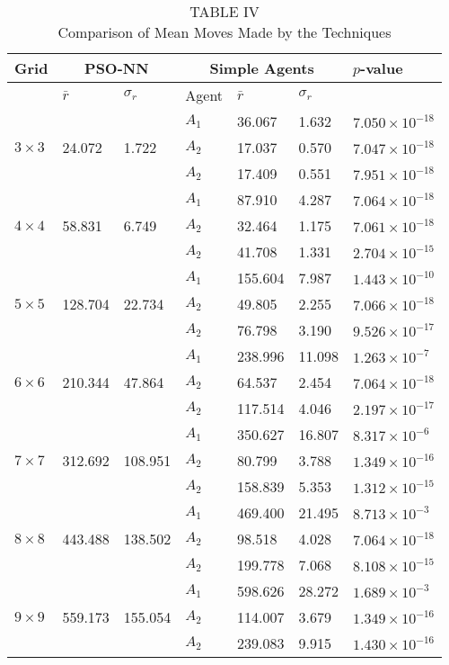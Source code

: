 \documentclass[10pt]{article}
\begin{document}
\begin{table}[h]
\begin{center}
\captionsetup{labelformat=empty}
\caption{TABLE IV\\
Comparison of Mean Moves Made by the Techniques}
\begin{tabular}{|l|l|l|l|l|l|l|}
\hline
\multirow{2}{*}{Grid} & \multicolumn{2}{|c|}{PSO-NN} & \multicolumn{3}{|c|}{Simple Agents} & \multirow{2}{*}{$p$-value} \\
\hline
 & $\bar{r}$ & $\sigma_{r}$ & Agent & $\bar{r}$ & $\sigma_{r}$ &  \\
\hline
\multirow{3}{*}{$3 \times 3$} &  &  & $A_{1}$ & 36.067 & 1.632 & $7.050 \times 10^{-18}$ \\
\hline
 & 24.072 & 1.722 & $A_{2}$ & 17.037 & 0.570 & $7.047 \times 10^{-18}$ \\
\hline
 &  &  & $A_{2}$ & 17.409 & 0.551 & $7.951 \times 10^{-18}$ \\
\hline
\multirow{3}{*}{$4 \times 4$} &  &  & $A_{1}$ & 87.910 & 4.287 & $7.064 \times 10^{-18}$ \\
\hline
 & 58.831 & 6.749 & $A_{2}$ & 32.464 & 1.175 & $7.061 \times 10^{-18}$ \\
\hline
 &  &  & $A_{2}$ & 41.708 & 1.331 & $2.704 \times 10^{-15}$ \\
\hline
\multirow{3}{*}{$5 \times 5$} &  &  & $A_{1}$ & 155.604 & 7.987 & $1.443 \times 10^{-10}$ \\
\hline
 & 128.704 & 22.734 & $A_{2}$ & 49.805 & 2.255 & $7.066 \times 10^{-18}$ \\
\hline
 &  &  & $A_{2}$ & 76.798 & 3.190 & $9.526 \times 10^{-17}$ \\
\hline
\multirow{3}{*}{$6 \times 6$} &  &  & $A_{1}$ & 238.996 & 11.098 & $1.263 \times 10^{-7}$ \\
\hline
 & 210.344 & 47.864 & $A_{2}$ & 64.537 & 2.454 & $7.064 \times 10^{-18}$ \\
\hline
 &  &  & $A_{2}$ & 117.514 & 4.046 & $2.197 \times 10^{-17}$ \\
\hline
\multirow{3}{*}{$7 \times 7$} &  &  & $A_{1}$ & 350.627 & 16.807 & $8.317 \times 10^{-6}$ \\
\hline
 & 312.692 & 108.951 & $A_{2}$ & 80.799 & 3.788 & $1.349 \times 10^{-16}$ \\
\hline
 &  &  & $A_{2}$ & 158.839 & 5.353 & $1.312 \times 10^{-15}$ \\
\hline
\multirow{3}{*}{$8 \times 8$} &  &  & $A_{1}$ & 469.400 & 21.495 & $8.713 \times 10^{-3}$ \\
\hline
 & 443.488 & 138.502 & $A_{2}$ & 98.518 & 4.028 & $7.064 \times 10^{-18}$ \\
\hline
 &  &  & $A_{2}$ & 199.778 & 7.068 & $8.108 \times 10^{-15}$ \\
\hline
\multirow{3}{*}{$9 \times 9$} &  &  & $A_{1}$ & 598.626 & 28.272 & $1.689 \times 10^{-3}$ \\
\hline
 & 559.173 & 155.054 & $A_{2}$ & 114.007 & 3.679 & $1.349 \times 10^{-16}$ \\
\hline
 &  &  & $A_{2}$ & 239.083 & 9.915 & $1.430 \times 10^{-16}$ \\
\hline
\end{tabular}
\end{center}
\end{table}
\end{document}
